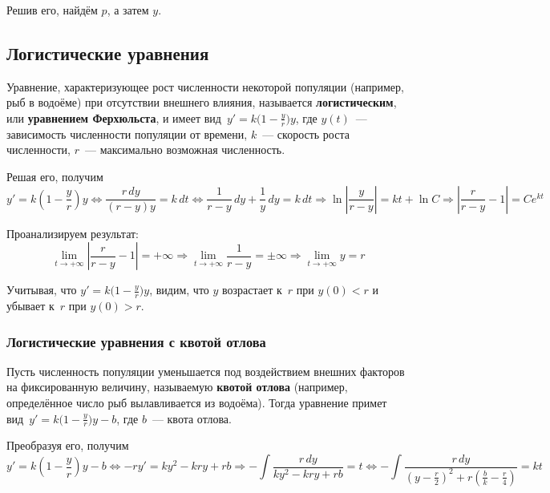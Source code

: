 Решив его, найдём $p$, а затем $y$.

\subsection{Логистические уравнения}
  Уравнение, характеризующее рост численности некоторой популяции (например, рыб в водоёме) при отсутствии внешнего влияния, называется \textbf{логистическим}, или \textbf{уравнением Ферхюльста}, и имеет вид~$y' = k \bigl( 1 - \frac{y}r \bigr) y$, где $y(t)$~--- зависимость численности популяции от времени, $k$~--- скорость роста численности, $r$~--- максимально возможная численность.

Решая его, получим
\begin{equation*}
y' = k(1 - \frac{y}r)y \Leftrightarrow
\frac{r\,dy}{(r - y)y} = k\,dt \Leftrightarrow
\frac1{r - y}\,dy + \frac1y\,dy = k\,dt \Rightarrow
\ln \left| \frac{y}{r - y} \right| = kt + \ln C \Rightarrow
\left| \frac{r}{r - y} - 1 \right| = C e^{kt}
\end{equation*}

Проанализируем результат:
\begin{equation*}
\lim_{t \to +\infty} \left| \frac{r}{r - y} - 1 \right| = +\infty \Rightarrow
\lim_{t \to +\infty} \frac1{r - y} = \pm\infty \Rightarrow
\lim_{t \to +\infty} y = r
\end{equation*}

Учитывая, что $y' = k \bigl( 1 - \frac{y}r \bigr) y$, видим, что $y$ возрастает к~$r$ при $y(0) < r$ и убывает к~$r$ при $y(0) > r$.

\subsubsection{Логистические уравнения с квотой отлова}
Пусть численность популяции уменьшается под воздействием внешних факторов на фиксированную величину, называемую \textbf{квотой отлова} (например, определённое число рыб вылавливается из водоёма).
Тогда уравнение примет вид~$y' = k \bigl( 1 - \frac{y}r \bigr) y - b$, где $b$~--- квота отлова.

Преобразуя его, получим
\begin{equation*}
y' = k \left( 1 - \frac{y}r \right) y - b \Leftrightarrow
-ry' = ky^2 - kry + rb \Rightarrow
-\int \frac{r\,dy}{ky^2 - kry + rb} = t \Leftrightarrow
-\int \frac{r\,dy}{\left( y - \frac{r}2 \right)^2 + r\left( \frac{b}k - \frac{r}4 \right)} = kt
\end{equation*}

